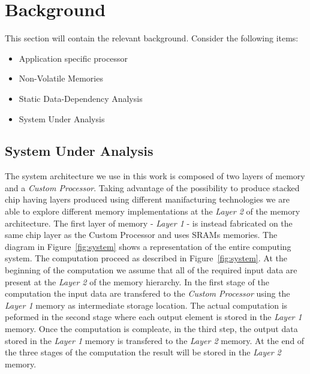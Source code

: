 \section{Background}
This section will contain the relevant background. Consider the following items:
\begin{itemize}
\item Application specific processor
\item Non-Volatile Memories
\item Static Data-Dependency Analysis
\item System Under Analysis
\end{itemize}

\subsection{System Under Analysis}
The system architecture we use in this work is composed of two layers of memory and a \textit{Custom Processor}. Taking advantage of the possibility to produce stacked chip having layers produced using different manifacturing technologies we are able to explore different memory implementations at the \textit{Layer 2} of the memory architecture. The first layer of memory - \textit{Layer 1} - is instead fabricated on the same chip layer as the Custom Processor and uses SRAMs memories. The diagram in Figure~\ref{fig:system} shows a representation of the entire computing system.
The computation proceed as described in Figure~\ref{fig:system}. At the beginning of the computation we assume that all of the required input data are present at the \textit{Layer 2} of the memory hierarchy. In the first stage of the computation the input data are transfered to the \textit{Custom Processor} using the \textit{Layer 1} memory as intermediate storage location. The actual computation is peformed in the second stage where each output element is stored in the \textit{Layer 1} memory. Once the computation is compleate, in the third step, the output data stored in the \textit{Layer 1} memory is transfered to the \textit{Layer 2} memory. At the end of the three stages of the computation the result will be stored in the \textit{Layer 2} memory.

